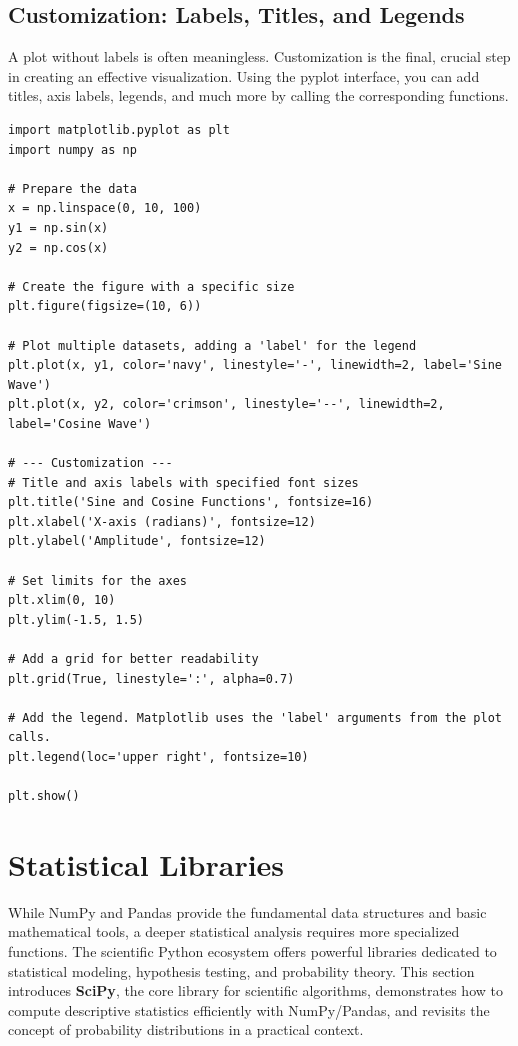 \subsection{Customization: Labels, Titles, and Legends}
\label{subsec:plot_customization}
A plot without labels is often meaningless. Customization is the final, crucial step in creating an effective visualization. Using the pyplot interface, you can add titles, axis labels, legends, and much more by calling the corresponding  functions.

\begin{example}
\text{ }\begin{verbatim}
import matplotlib.pyplot as plt
import numpy as np

# Prepare the data
x = np.linspace(0, 10, 100)
y1 = np.sin(x)
y2 = np.cos(x)

# Create the figure with a specific size
plt.figure(figsize=(10, 6))

# Plot multiple datasets, adding a 'label' for the legend
plt.plot(x, y1, color='navy', linestyle='-', linewidth=2, label='Sine Wave')
plt.plot(x, y2, color='crimson', linestyle='--', linewidth=2, label='Cosine Wave')

# --- Customization ---
# Title and axis labels with specified font sizes
plt.title('Sine and Cosine Functions', fontsize=16)
plt.xlabel('X-axis (radians)', fontsize=12)
plt.ylabel('Amplitude', fontsize=12)

# Set limits for the axes
plt.xlim(0, 10)
plt.ylim(-1.5, 1.5)

# Add a grid for better readability
plt.grid(True, linestyle=':', alpha=0.7)

# Add the legend. Matplotlib uses the 'label' arguments from the plot calls.
plt.legend(loc='upper right', fontsize=10)

plt.show()
\end{verbatim}
\end{example}


\section{Statistical Libraries}
\label{sec:statistical_libraries}
While NumPy and Pandas provide the fundamental data structures and basic mathematical tools, a deeper statistical analysis requires more specialized functions. The scientific Python ecosystem offers powerful libraries dedicated to statistical modeling, hypothesis testing, and probability theory. This section introduces \textbf{SciPy}, the core library for scientific algorithms, demonstrates how to compute descriptive statistics efficiently with NumPy/Pandas, and revisits the concept of probability distributions in a practical context.

